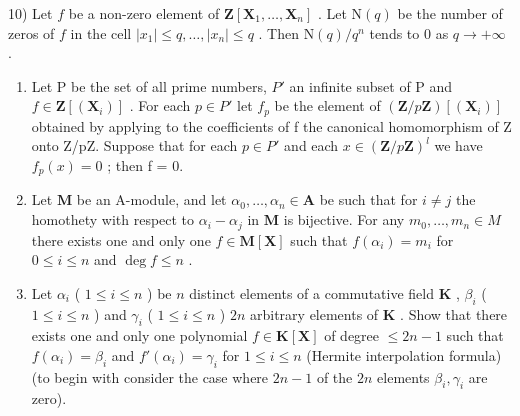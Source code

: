 10) Let \(f\) be a non-zero element of \(\mathbf{Z}[\mathbf{X}_1, \ldots, \mathbf{X}_n]\) . Let \(\mathrm{N}(q)\) be the number of zeros of \(f\) in the cell \(|x_1| \leqslant q, \ldots, |x_n| \leqslant q\) . Then \(\mathrm{N}(q) / q^n\) tends to 0 as \(q \to +\infty\) .

\begin{enumerate}
\def\labelenumi{\arabic{enumi})}
\setcounter{enumi}{10}
\item
  Let P be the set of all prime numbers, \(P'\) an infinite subset of P and \(f \in \mathbf{Z}[(\mathbf{X}_i)]\) . For each \(p \in P'\) let \(f_p\) be the element of \((\mathbf{Z}/p\mathbf{Z})[(\mathbf{X}_i)]\) obtained by applying to the coefficients of f the canonical homomorphism of Z onto Z/pZ. Suppose that for each \(p \in P'\) and each \(x \in (\mathbf{Z}/p\mathbf{Z})^l\) we have \(f_p(x) = 0\) ; then f = 0.
\item
  Let \(\mathbf{M}\) be an A-module, and let \(\alpha_0, \ldots, \alpha_n \in \mathbf{A}\) be such that for \(i \neq j\) the homothety with respect to \(\alpha_i - \alpha_j\) in \(\mathbf{M}\) is bijective. For any \(m_0, \ldots, m_n \in M\) there exists one and only one \(f \in \mathbf{M}[\mathbf{X}]\) such that \(f(\alpha_i) = m_i\) for \(0 \leqslant i \leqslant n\) and \(\deg f \leqslant n\) .
\item
  Let \(\alpha_{i}\) ( \(1 \leqslant i \leqslant n\) ) be \(n\) distinct elements of a commutative field \(\mathbf{K}\) , \(\beta_{i}\) ( \(1 \leqslant i \leqslant n\) ) and \(\gamma_{i}\) ( \(1 \leqslant i \leqslant n\) ) \(2n\) arbitrary elements of \(\mathbf{K}\) . Show that there exists one and only one polynomial \(f \in \mathbf{K}[\mathbf{X}]\) of degree \(\leqslant 2n - 1\) such that \(f(\alpha_{i}) = \beta_{i}\) and \(f'(\alpha_{i}) = \gamma_{i}\) for \(1 \leqslant i \leqslant n\) (Hermite interpolation formula) (to begin with consider the case where \(2n - 1\) of the \(2n\) elements \(\beta_{i}, \gamma_{i}\) are zero).
\end{enumerate}

\BourbakiExerciseGroup

